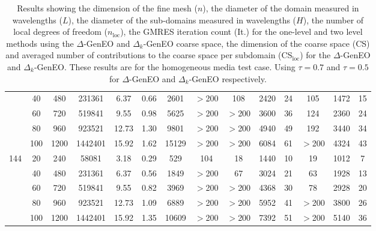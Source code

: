 \documentclass[preprint,3p,times]{elsarticle}
\theoremstyle{definition}
\numberwithin{equation}{section}
\begin{document}
{\begin{table}[H]
\begin{tabular}{ccccccc|c|ccc|ccc}
 & 40 & 480 & 231361 &  6.37 & 0.66 & 2601 & $>$200 & 108 & 2420 & 24 & 105 & 1472 & 15 \\
 & 60 & 720 & 519841 &  9.55 & 0.98 & 5625 & $>$200 & $>$200 & 3600 & 36 & 124 & 2360 & 24 \\
 & 80 & 960 & 923521 &  12.73 & 1.30 & 9801 & $>$200 & $>$200 & 4940 & 49 & 192 & 3440 & 34 \\
 & 100 & 1200 & 1442401 &  15.92 & 1.62 & 15129 & $>$200 & $>$200 & 6084 & 61 & $>$200 & 4324 & 43 \\
\hline
144 & 20 & 240 & 58081 & 3.18 & 0.29 & 529 & 104 & 18 & 1440 & 10 & 19 & 1012 & 7 \\
 & 40 & 480 & 231361 &  6.37 & 0.56 & 1849 & $>$200 & 67 & 3024 & 21 & 63 & 1928 & 13 \\
 & 60 & 720 & 519841 &  9.55 & 0.82 & 3969 & $>$200 & $>$200 & 4368 & 30 & 78 & 2928 & 20 \\
 & 80 & 960 & 923521 &  12.73 & 1.09 & 6889 & $>$200 & $>$200 & 5952 & 41 & $>$200 & 3800 & 26 \\
 & 100 & 1200 & 1442401 &  15.92 & 1.35 & 10609 & $>$200 & $>$200 & 7392 & 51 & $>$200 & 5140 & 36 \\
\hline
\end{tabular}
    \caption{Results showing the dimension of the fine mesh ($n$), the diameter of the domain measured in wavelengths ($L$), the diameter of the sub-domains measured in wavelengths ($H$), the number of local degrees of freedom ($n_\text{loc}$), the GMRES iteration count (It.) for the one-level and two level methods using the $\Delta$-GenEO and $\Delta_k$-GenEO coarse space, the dimension of the coarse space (CS) and averaged number of contributions to the coarse space per subdomain (CS$_\text{loc}$) for the $\Delta$-GenEO and $\Delta_k$-GenEO. These results are for the homogeneous media test case. Using $\tau = 0.7$ and $\tau=0.5$ for $\Delta$-GenEO and $\Delta_k$-GenEO respectively.}
    \label{table:DeltaHomog}
\end{table}

}
\end{document}

